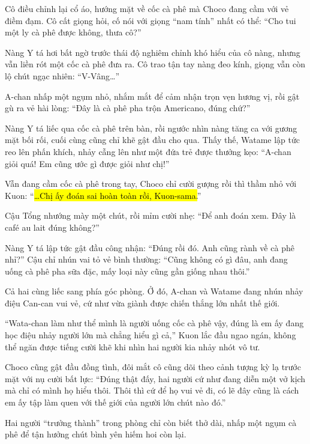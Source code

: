 \documentclass[../main.tex]{subfiles}
\begin{document}
Cô điều chỉnh lại cổ áo, hướng mặt về cốc cà phê mà Choco đang cầm với vẻ điềm đạm. Cô cất giọng hỏi, cố nói với giọng ``nam tính'' nhất có thể: ``Cho tui một ly cà phê được không, thưa cô?''

Nàng Y tá hơi bất ngờ trước thái độ nghiêm chỉnh khó hiểu của cô nàng, nhưng vẫn liền rót một cốc cà phê đưa ra. Cô trao tận tay nàng đeo kính, giọng vẫn còn lộ chút ngạc nhiên: ``V-Vâng\dots''

A-chan nhấp một ngụm nhỏ, nhắm mắt để cảm nhận trọn vẹn hương vị, rồi gật gù ra vẻ hài lòng: ``Đây là cà phê pha trộn Americano, đúng chứ?''

Nàng Y tá liếc qua cốc cà phê trên bàn, rồi ngước nhìn nàng tăng ca với gương mặt bối rối, cuối cùng cũng chỉ khẽ gật đầu cho qua. Thấy thế, Watame lập tức reo lên phấn khích, nhảy cẫng lên như một đứa trẻ được thưởng kẹo: ``A-chan giỏi quá! Em cũng ước gì được giỏi như chị!''

Vẫn đang cầm cốc cà phê trong tay, Choco chỉ cười gượng rồi thì thầm nhỏ với Kuon: ``\hl{\dots Chị ấy đoán sai hoàn toàn rồi, Kuon-sama.}''

Cậu Tổng nhướng mày một chút, rồi mỉm cười nhẹ: ``Để anh đoán xem. Đây là café au lait đúng không?''

Nàng Y tá lập tức gật đầu công nhận: ``Đúng rồi đó. Anh cũng rành về cà phê nhỉ?'' Cậu chỉ nhún vai tỏ vẻ bình thường: ``Cũng không có gì đâu, anh đang uống cà phê pha sữa đặc, mấy loại này cũng gần giống nhau thôi.''

Cả hai cùng liếc sang phía góc phòng. Ở đó, A-chan và Watame đang nhún nhảy điệu Can-can vui vẻ, cứ như vừa giành được chiến thắng lớn nhất thế giới.


``Wata-chan làm như thể mình là người uống cốc cà phê vậy, đúng là em ấy đang học điệu nhảy người lớn mà chẳng hiểu gì cả,'' Kuon lắc đầu ngao ngán, không thể ngăn được tiếng cười khẽ khi nhìn hai người kia nhảy nhót vô tư.

Choco cũng gật đầu đồng tình, đôi mắt cô cũng dõi theo cảnh tượng kỳ lạ trước mặt với nụ cười bất lực: ``Đúng thật đấy, hai người cứ như đang diễn một vở kịch mà chỉ có mình họ hiểu thôi. Thôi thì cứ để họ vui vẻ đi, có lẽ đây cũng là cách em ấy tập làm quen với thế giới của người lớn chút nào đó.''

Hai người ``trưởng thành'' trong phòng chỉ còn biết thở dài, nhấp một ngụm cà phê để tận hưởng chút bình yên hiếm hoi còn lại.
\omk
\end{document}
